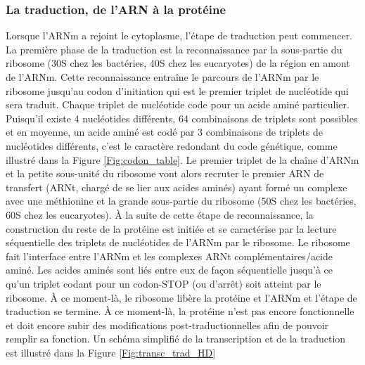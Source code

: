 \subsubsection{La traduction, de l'ARN à la protéine}



Lorsque l'ARNm a rejoint le cytoplasme, l'étape de traduction peut commencer. La première phase de la traduction est la reconnaissance par la sous-partie du ribosome (30S chez les bactéries, 40S chez les eucaryotes) de la région en amont de l'ARNm. Cette reconnaissance entraîne le parcours de l'ARNm par le ribosome jusqu'au codon d'initiation qui est le premier triplet de nucléotide qui sera traduit. Chaque triplet de nucléotide code pour un acide aminé particulier. Puisqu'il existe 4 nucléotides différents, 64 combinaisons de triplets sont possibles et en moyenne, un acide aminé est codé par 3 combinaisons de triplets de nucléotides différents, c'est le caractère redondant du code génétique, comme illustré dans la Figure \ref{Fig:codon_table}. 
Le premier triplet de la chaîne d'ARNm et la petite sous-unité du ribosome vont alors recruter le premier ARN de transfert (ARNt, chargé de se lier aux acides aminés) ayant formé un complexe avec une méthionine et la grande sous-partie du ribosome (50S chez les bactéries, 60S chez les eucaryotes). À la suite de cette étape de reconnaissance, la construction du reste de la protéine est initiée et se caractérise par la lecture séquentielle des triplets de nucléotides de l'ARNm par le ribosome. Le ribosome fait l'interface entre l'ARNm et les complexes ARNt complémentaires/acide aminé. Les acides aminés sont liés entre eux de façon séquentielle jusqu'à ce qu'un triplet codant pour un codon-STOP (ou d'arrêt) soit atteint par le ribosome. À ce moment-là, le ribosome libère la protéine et l'ARNm et l'étape de traduction se termine. À ce moment-là, la protéine n'est pas encore fonctionnelle et doit encore subir des modifications post-traductionnelles afin de pouvoir remplir sa fonction. Un schéma simplifié de la transcription et de la traduction est illustré dans la Figure \ref{Fig:transc_trad_HD}

